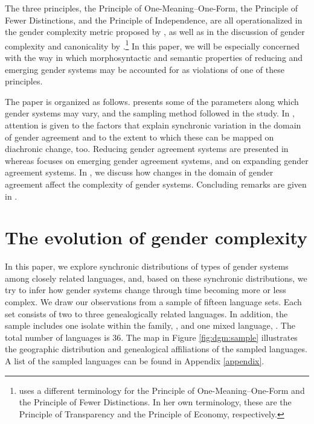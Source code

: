 \documentclass[output=collectionpaper]{langsci/langscibook}
\begin{document}
The three principles, the Principle of One-Meaning–One-Form, the Principle of Fewer Distinctions, and the Principle of Independence, are all operationalized in the gender complexity metric proposed by \citet{DiGarbo2014,DiGarbo2016}, as well as in the discussion of gender complexity and canonicality by \citet{Audringthisyear}.\footnote{\citet{Audringthisyear} uses a different terminology for the Principle of One-Meaning--One-Form and the Principle of Fewer Distinctions. In her own terminology, these are the Principle of Transparency and the Principle of Economy, respectively.} In this paper, we will be especially concerned with the way in which morphosyntactic and semantic properties of reducing and emerging gender systems may be accounted for as violations of one of these principles.

The paper is organized as follows.  presents some of the parameters along which gender systems may vary, and the sampling method followed in the study. In , attention is given to the factors that explain synchronic variation in the domain of gender agreement and to the extent to which these can be mapped on diachronic change, too. Reducing gender agreement systems are presented in  whereas  focuses on emerging gender agreement systems, and  on expanding gender agreement systems. In  , we discuss how changes in the domain of gender agreement affect the complexity of gender systems. Concluding remarks are given in .



\section{The evolution of gender complexity}
\label{sec:dgm:evolution}

In this paper, we explore synchronic distributions of types of gender systems among closely related languages, and, based on these synchronic distributions, we try to infer how gender systems change through time becoming more or less complex. We draw our observations from a sample of fifteen language sets. Each set consists of two to three genealogically related languages. In addition, the sample includes one isolate within the  family, , and one mixed language, . The total number of languages is 36. The map in Figure \ref{fig:dgm:sample} illustrates the geographic distribution and genealogical affiliations of the sampled languages. A list of the sampled languages can be found in Appendix \ref{appendix}.
\end{document}

